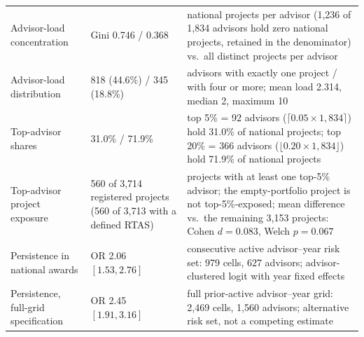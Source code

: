 \begin{table}[H]
\begin{tabular}{p{1.55in}p{1.05in}p{3.15in}}
Advisor-load concentration & Gini 0.746 / 0.368 & national projects per advisor (1,236 of 1,834 advisors hold zero national projects, retained in the denominator) vs.\ all distinct projects per advisor\\
Advisor-load distribution & 818 (44.6\%) / 345 (18.8\%) & advisors with exactly one project / with four or more; mean load 2.314, median 2, maximum 10\\
Top-advisor shares & 31.0\% / 71.9\% & top 5\% = 92 advisors ($\lceil 0.05\times1{,}834\rceil$) hold 31.0\% of national projects; top 20\% = 366 advisors ($\lfloor 0.20\times1{,}834\rfloor$) hold 71.9\% of national projects\\
Top-advisor project exposure & 560 of 3,714 registered projects (560 of 3,713 with a defined RTAS) & projects with at least one top-5\% advisor; the empty-portfolio project is not top-5\%-exposed; mean difference vs.\ the remaining 3,153 projects: Cohen $d=0.083$, Welch $p=0.067$\\
Persistence in national awards & OR 2.06 $[1.53,2.76]$ & consecutive active advisor--year risk set: 979 cells, 627 advisors; advisor-clustered logit with year fixed effects\\
Persistence, full-grid specification & OR 2.45 $[1.91,3.16]$ & full prior-active advisor--year grid: 2,469 cells, 1,560 advisors; alternative risk set, not a competing estimate\\
\bottomrule
\end{tabular}
\end{table}

